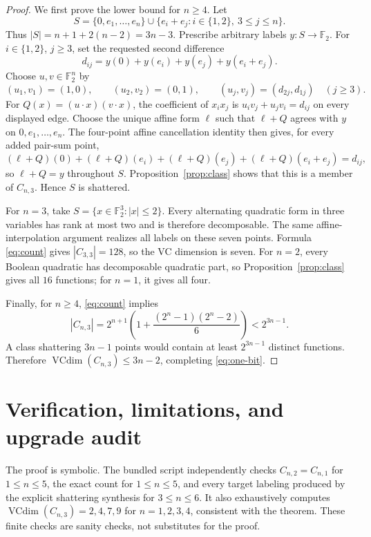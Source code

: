 \documentclass[11pt]{article}
\newcommand{\F}{\mathbb F}
\newcommand{\VC}{\operatorname{VCdim}}
\begin{document}
\begin{proof}
We first prove the lower bound for \(n\ge4\).  Let
\[
 S=\{0,e_1,\ldots,e_n\}
 \cup\{e_i+e_j:i\in\{1,2\},\ 3\le j\le n\}.
\]
Thus \(|S|=n+1+2(n-2)=3n-3\).  Prescribe arbitrary labels
\(y:S\to\F_2\).  For \(i\in\{1,2\}\), \(j\ge3\), set the requested second
difference
\[
 d_{ij}=y(0)+y(e_i)+y(e_j)+y(e_i+e_j).
\]
Choose \(u,v\in\F_2^n\) by
\[
 (u_1,v_1)=(1,0),\qquad (u_2,v_2)=(0,1),\qquad
 (u_j,v_j)=(d_{2j},d_{1j})\quad(j\ge3).
\]
For \(Q(x)=(u\cdot x)(v\cdot x)\), the coefficient of \(x_ix_j\) is
\(u_iv_j+u_jv_i=d_{ij}\) on every displayed edge.  Choose the unique affine
form \(\ell\) such that \(\ell+Q\) agrees with \(y\) on
\(0,e_1,\ldots,e_n\).  The four-point affine cancellation identity then
gives, for every added pair-sum point,
\[
 (\ell+Q)(0)+(\ell+Q)(e_i)+(\ell+Q)(e_j)
 +(\ell+Q)(e_i+e_j)=d_{ij},
\]
so \(\ell+Q=y\) throughout \(S\).  Proposition~\ref{prop:class} shows that
this is a member of \(C_{n,3}\).  Hence \(S\) is shattered.

For \(n=3\), take \(S=\{x\in\F_2^3:|x|\le2\}\).  Every alternating
quadratic form in three variables has rank at most two and is therefore
decomposable.  The same affine-interpolation argument realizes all labels on
these seven points.  Formula \eqref{eq:count} gives
\(|C_{3,3}|=128\), so the VC dimension is seven.  For \(n=2\), every Boolean
quadratic has decomposable quadratic part, so Proposition~\ref{prop:class}
gives all \(16\) functions; for \(n=1\), it gives all four.

Finally, for \(n\ge4\), \eqref{eq:count} implies
\[
 |C_{n,3}|
 =2^{n+1}\left(1+\frac{(2^n-1)(2^n-2)}6\right)
 <2^{3n-1}.
\]
A class shattering \(3n-1\) points would contain at least \(2^{3n-1}\)
distinct functions.  Therefore \(\VC(C_{n,3})\le3n-2\), completing
\eqref{eq:one-bit}.
\end{proof}

\small
\section*{Verification, limitations, and upgrade audit}
The proof is symbolic.  The bundled script independently checks
\(C_{n,2}=C_{n,1}\) for \(1\le n\le5\), the exact count for
\(1\le n\le5\), and every target labeling produced by the explicit
shattering synthesis for \(3\le n\le6\).  It also exhaustively computes
\(\VC(C_{n,3})=2,4,7,9\) for \(n=1,2,3,4\), consistent with the theorem.
These finite checks are sanity checks, not substitutes for the proof.
\end{document}
